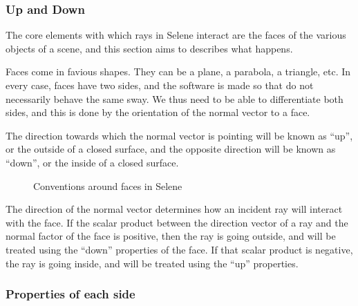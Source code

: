 \subsubsection{Up and Down}

The core elements with which rays in Selene interact are the faces of the various objects of a scene, and this section aims to describes what happens.

Faces come in favious shapes. They can be a plane, a parabola, a triangle, etc. In every case, faces have two sides, and the software is made so that do not necessarily behave the same sway. We thus need to be able to differentiate both sides, and this is done by the orientation of the normal vector to a face.

The direction towards which the normal vector is pointing will be known as ``up'', or the outside of a closed surface, and the opposite direction will be known as ``down'', or the inside of a closed surface.
\begin{figure}[!ht]
\begin{center}\end{center}
\caption{Conventions around faces in Selene}
\end{figure}
The direction of the normal vector determines how an incident ray will interact with the face. If the scalar product between the direction vector of a ray and the normal factor of the face is positive, then the ray is going outside, and will be treated using the ``down'' properties of the face. If that scalar product is negative, the ray is going inside, and will be treated using the ``up'' properties.

\subsubsection{Properties of each side}

